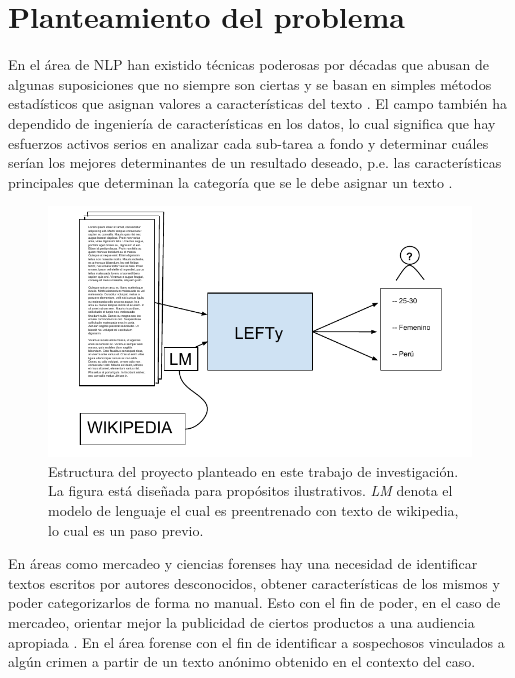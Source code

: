 \section{Planteamiento del problema}

En el área de NLP han existido técnicas poderosas por décadas que abusan de algunas suposiciones que no siempre son ciertas y se basan en simples métodos estadísticos que asignan valores a características del texto \parencite{Edmundson1969, kupiec1995trainable}. El campo también ha dependido de ingeniería de características en los datos, lo cual significa que hay esfuerzos activos serios en analizar cada sub-tarea a fondo y determinar cuáles serían los mejores determinantes de un resultado deseado, p.e. las características principales que determinan la categoría que se le debe asignar un texto \parencite{aggarwal2012mining}.

\begin{figure}
\includegraphics[scale=1.0]{Figures/projectstruct.pdf}
\caption{Estructura del proyecto planteado en este trabajo de investigación. La figura está diseñada para propósitos ilustrativos. \textit{LM} denota el modelo de lenguaje el cual es preentrenado con texto de wikipedia, lo cual es un paso previo.}
\label{fig:projstruct}
\end{figure}

En áreas como mercadeo y ciencias forenses hay una necesidad de identificar textos escritos por autores desconocidos, obtener características de los mismos y poder categorizarlos de forma no manual. Esto con el fin de poder, en el caso de mercadeo, orientar mejor la publicidad de ciertos productos a una audiencia apropiada \parencite{aggarwal2012mining}. En el área forense con el fin de identificar a sospechosos vinculados a algún crimen a partir de un texto anónimo obtenido en el contexto del caso.

